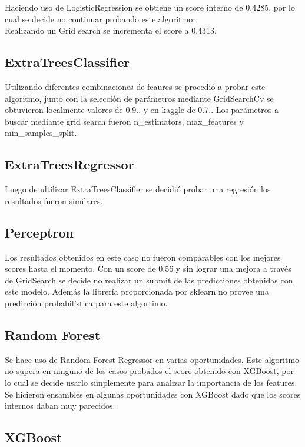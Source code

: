 \documentclass[a4paper]{article}
\begin{document}
        Haciendo uso de LogisticRegression se obtiene un score interno de 0.4285, por lo cual se decide no continuar probando este algoritmo.\\
        Realizando un Grid search se incrementa el score a 0.4313.\\

     \subsection{ExtraTreesClassifier}
        Utilizando diferentes combinaciones de feaures se procedió a probar este algoritmo, junto con la selección de parámetros mediante GridSearchCv se obtuvieron localmente valores de 0.9.. y en kaggle de 0.7..
        Los parámetros a buscar mediante grid search fueron n\_estimators, max\_features y min\_samples\_split.
        
    \subsection{ExtraTreesRegressor} 
    Luego de ultilizar ExtraTreesClassifier se decidió probar una regresión los resultados fueron similares.
    
    \subsection{Perceptron}
    Los resultados obtenidos en este caso no fueron comparables con los mejores scores hasta el momento. Con un score de 0.56 y sin lograr una mejora a través de GridSearch se decide no realizar un submit de las predicciones obtenidas con este modelo. Además la librería proporcionada por sklearn no provee una predicción probabilística para este algortimo.
    
    \subsection{Random Forest}\label{subsec:Random Forest}
    
       Se hace uso de Random Forest Regressor en varias oportunidades. Este algoritmo no supera en ninguno de los casos probados el score obtenido con XGBoost, por lo cual se decide usarlo simplemente para analizar la importancia de los features.\\
       Se hicieron ensambles en algunas oportunidades con XGBoost dado que los scores internos daban muy parecidos.
        
    \subsection{XGBoost}\label{subset:xgboost}
        
\end{document}
